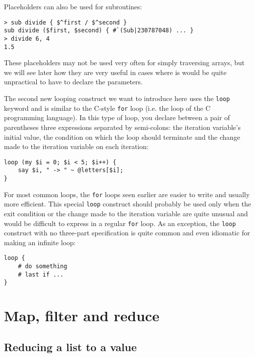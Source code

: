 Placeholders can also be used for subroutines:

\begin{verbatim}
> sub divide { $^first / $^second }
sub divide ($first, $second) { #`(Sub|230787048) ... }
> divide 6, 4
1.5
\end{verbatim}
%

These placeholders may not be used very often for 
simply traversing arrays, but we will see later how  
they are very useful in cases where is would be quite 
unpractical to have to declare the parameters.

\label{C-style loop}
The second new looping construct we want to introduce 
here uses the {\tt loop} keyword and is similar to 
the C-style {\tt for} loop (i.e. the loop of the 
C programming language). In this type of loop, you 
declare between a pair of parentheses three expressions 
separated by semi-colons: the iteration variable's 
initial value, the condition on which the loop should 
terminate and the change made to the iteration variable on 
each iteration:

\begin{verbatim}
loop (my $i = 0; $i < 5; $i++) {
    say $i, " -> " ~ @letters[$i];
}
\end{verbatim}
%
For most common loops, the {\tt for} loops seen earlier 
are easier to write and usually more efficient. This 
special {\tt loop} construct should probably be used 
only when the exit condition or the change made to 
the iteration variable are quite unusual and would 
be difficult to express in a regular {\tt for} loop. As 
an exception, the {\tt loop} construct with no 
three-part specification is quite common and even 
idiomatic for making an infinite loop:

\begin{verbatim}
loop {
    # do something 
    # last if ...
}
\end{verbatim}
%


\section{Map, filter and reduce}
\label{map_filter}

\subsection{Reducing a list to a value}

